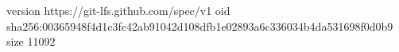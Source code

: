 version https://git-lfs.github.com/spec/v1
oid sha256:00365948f4d1c3fc42ab91042d108dfb1e02893a6c336034b4da531698f0d0b9
size 11092
